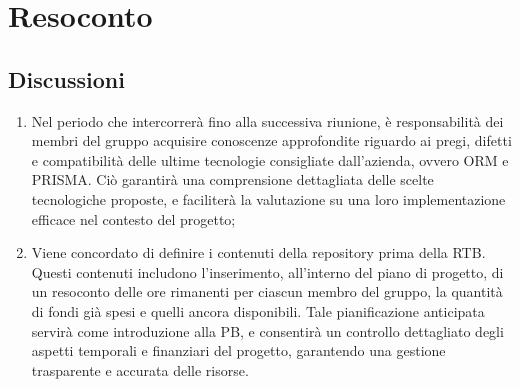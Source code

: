 \section{Resoconto} \label{sec:resoconto}
\subsection{Discussioni} \label{subsec:resdiscussione}
\begin{enumerate}
    \item Nel periodo che intercorrerà fino alla successiva riunione, è responsabilità dei membri del gruppo acquisire conoscenze approfondite riguardo ai pregi, difetti e compatibilità delle ultime tecnologie consigliate dall'azienda, ovvero ORM e PRISMA. Ciò garantirà una comprensione dettagliata delle scelte tecnologiche proposte, e faciliterà la valutazione su una loro implementazione efficace nel contesto del progetto; 
    
    \item Viene concordato di definire i contenuti della repository prima della RTB. Questi contenuti includono l'inserimento, all'interno del piano di progetto, di un resoconto delle ore rimanenti per ciascun membro del gruppo, la quantità di fondi già spesi e quelli ancora disponibili. Tale pianificazione anticipata servirà come introduzione alla PB, e consentirà un controllo dettagliato degli aspetti temporali e finanziari del progetto, garantendo una gestione trasparente e accurata delle risorse.
    
\end{enumerate}

